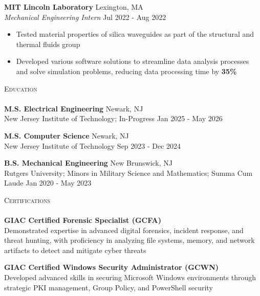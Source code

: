 \documentclass[a4paper]{article}
\newcommand{\lineunder} {
        \vspace*{-8pt} \\
        \hspace*{-18pt} \hrulefill \\
    }
\newcommand{\header} [1] {
        {\hspace*{-18pt}\vspace*{6pt} \textsc{#1}}
        \vspace*{-6pt} \lineunder
    }
\begin{document}
                \textbf{MIT Lincoln Laboratory} \hfill Lexington, MA\\
                \textit{Mechanical Engineering Intern} \hfill Jul 2022 - Aug 2022\\
                \vspace{-1mm}
                \begin{itemize} \itemsep 1pt
                
                \item Tested material properties of silica waveguides as part of the structural and thermal fluids group
                \item Developed various software solutions to streamline data analysis processes and solve simulation problems, reducing data processing time by \textbf{35\%}\end{itemize}
    \header{Education}
    
            \textbf{M.S. Electrical Engineering} \hfill Newark, NJ\\
            New Jersey Institute of Technology; In-Progress \hfill Jan 2025 - May 2026\\
            \vspace{2mm}
            
            \textbf{M.S. Computer Science} \hfill Newark, NJ\\
            New Jersey Institute of Technology \hfill Sep 2023 - Dec 2024\\
            \vspace{2mm}
            
            \textbf{B.S. Mechanical Engineering} \hfill New Brunswick, NJ\\
            Rutgers University; Minors in Military Science and Mathematics; Summa Cum Laude \hfill Jan 2020 - May 2023\\
            \vspace{2mm}
            
    \header{Certifications}
    
            {\textbf{GIAC Certified Forensic Specialist (GCFA)}}\\
            Demonstrated expertise in advanced digital forensics, incident response, and threat hunting, with proficiency in analyzing file systems, memory, and network artifacts to detect and mitigate cyber threats\\
            \vspace*{2mm}
            
            {\textbf{GIAC Certified Windows Security Administrator (GCWN)}}\\
            Developed advanced skills in securing Microsoft Windows environments through strategic PKI management, Group Policy, and PowerShell security\\
            \vspace*{2mm}
            
\end{document}
